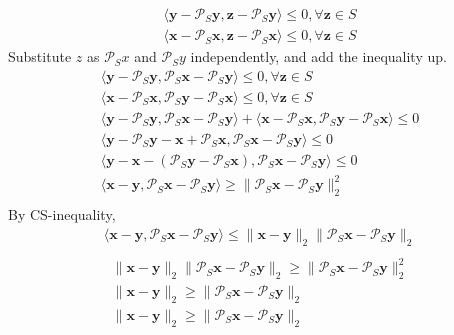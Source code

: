 \documentclass[12pt]{article}
\begin{document}
\begin{align*}
    \langle \bm{y} - \mathcal{P}_S \bm{y}, \bm{z} - \mathcal{P}_S \bm{y}\rangle \leq 0, \forall \bm{z} \in S \\
    \langle \bm{x} - \mathcal{P}_S \bm{x}, \bm{z} - \mathcal{P}_S \bm{x}\rangle \leq 0, \forall \bm{z} \in S
\end{align*}
Substitute \(z\) as \(\mathcal{P}_S x\) and \(\mathcal{P}_S y\) independently, and add the inequality up.
\begin{align*}
    \langle \bm{y} - \mathcal{P}_S \bm{y}, \mathcal{P}_S \bm{x} - \mathcal{P}_S \bm{y}\rangle \leq 0, \forall \bm{z} \in S \\
    \langle \bm{x} - \mathcal{P}_S \bm{x}, \mathcal{P}_S \bm{y} - \mathcal{P}_S \bm{x}\rangle \leq 0, \forall \bm{z} \in S \\
    \langle \bm{y} - \mathcal{P}_S \bm{y}, \mathcal{P}_S \bm{x} - \mathcal{P}_S \bm{y}\rangle + \langle \bm{x} - \mathcal{P}_S \bm{x}, \mathcal{P}_S \bm{y} - \mathcal{P}_S \bm{x}\rangle \leq 0 \\
    \langle \bm{y} - \mathcal{P}_S \bm{y} - \bm{x} + \mathcal{P}_S \bm{x}, \mathcal{P}_S \bm{x} - \mathcal{P}_S \bm{y}\rangle  \leq 0 \\
    \langle \bm{y} - \bm{x} - (\mathcal{P}_S \bm{y}  - \mathcal{P}_S \bm{x}), \mathcal{P}_S \bm{x} - \mathcal{P}_S \bm{y}\rangle  \leq 0 \\
    \langle \bm{x} - \bm{y}, \mathcal{P}_S \bm{x} - \mathcal{P}_S \bm{y}\rangle  \geq \|\mathcal{P}_S \bm{x} - \mathcal{P}_S \bm{y}\|_2^2 \\
\end{align*}
By CS-inequality,
\begin{align*}
    \langle \bm{x} - \bm{y}, \mathcal{P}_S \bm{x} - \mathcal{P}_S \bm{y}\rangle  \leq \|\bm{x} - \bm{y}\|_2 \|\mathcal{P}_S \bm{x} - \mathcal{P}_S \bm{y}\|_2 \\
\end{align*}
\begin{align*}
    \|\bm{x} - \bm{y}\|_2 \|\mathcal{P}_S \bm{x} - \mathcal{P}_S \bm{y}\|_2 \geq \|\mathcal{P}_S \bm{x} - \mathcal{P}_S \bm{y}\|_2^2 \\
    \|\bm{x} - \bm{y}\|_2 \geq \|\mathcal{P}_S \bm{x} - \mathcal{P}_S \bm{y}\|_2 \\
    \|\bm{x} - \bm{y}\|_2 \geq \|\mathcal{P}_S \bm{x} - \mathcal{P}_S \bm{y}\|_2 \\
\end{align*}
\end{document}
